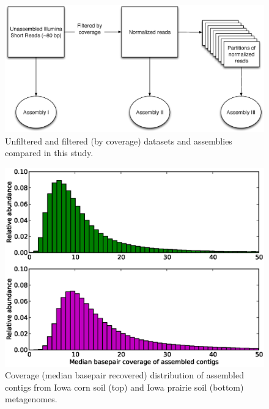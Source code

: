 \documentclass{pnastwo}
\begin{document}
\begin{figure}
\centerline{\includegraphics[width=.7\textwidth]{./figures/new_flowchart.eps}}
\caption{Unfiltered and filtered (by coverage) datasets and assemblies compared in this study.}
\label{flowchart}
\end{figure}

\begin{figure} \begin{center}
\centerline{\includegraphics[width=.7\textwidth]{./figures/fig3-coverage.eps}}
\caption{Coverage (median basepair recovered) distribution of assembled contigs
from Iowa corn soil (top) and Iowa prairie soil (bottom) metagenomes.}
\label{soilassemblycoverage} \end{center} \end{figure}
\end{document}
